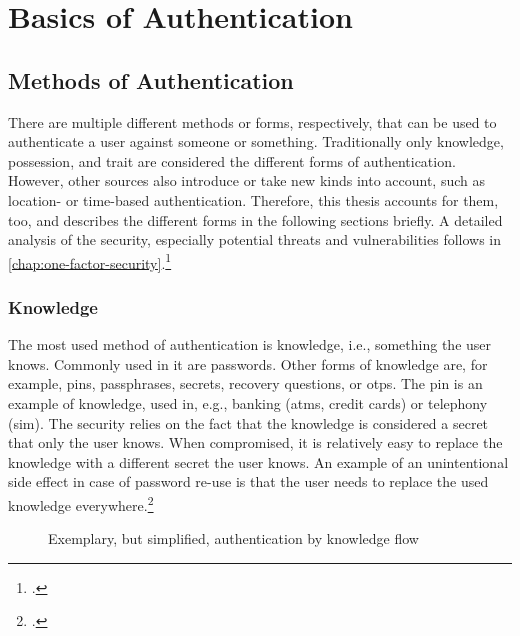 \chapter{Basics of Authentication}
\label{chapter:basics}

\section{Methods of Authentication}
There are multiple different methods or forms, respectively, that can be used to authenticate a user against someone or something. Traditionally only knowledge, possession, and trait are considered the different forms of authentication. However, other sources also introduce or take new kinds into account, such as location- or time-based authentication. Therefore, this thesis accounts for them, too, and describes the different forms in the following sections briefly. A detailed analysis of the security, especially potential threats and vulnerabilities follows in \autoref{chap:one-factor-security}.\footcites[See][299]{10.2307/27845364}[See][140]{brotherston2017defensive}[See][47]{anderson2008security}[See][]{6296127}[See][191]{dasgupta2017multi}

\subsection{Knowledge}

The most used method of authentication is knowledge, i.e., \frqq something the user knows\flqq{}. Commonly used in \gls{it} are passwords. Other forms of knowledge are, for example, \glspl{pin}, passphrases, secrets, recovery questions, or \glspl{otp}. The \gls{pin} is an example of knowledge, used in, e.g., banking (\glspl{atm}, credit cards) or telephony (\gls{sim}). The security relies on the fact that the knowledge is considered a secret that only the user knows. When compromised, it is relatively easy to replace the knowledge with a different secret the user knows. An example of an unintentional side effect in case of password re-use is that the user needs to replace the used knowledge everywhere.\footcite[See][467]{eckert-it-sec-9}

\newpage

\begin{figure}[hbt]
	\centering
	
	\caption[Exemplary, but simplified, authentication by knowledge flow]{Exemplary, but simplified, authentication by knowledge flow\footnotemark}
	\label{fig:knowledge_auth_flow}
\end{figure}

